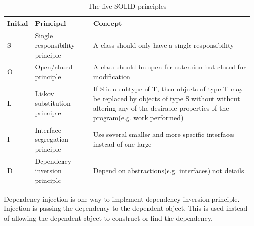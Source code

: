 \documentclass[10pt,a4paper]{report}
\begin{document}
\begin{table}[h]
\begin{tabular}{ l l p{2in}}
  \hline
  Initial & Principal & Concept\\
  \hline
  S & Single responsibility principle & A class should only have a single responsibility \\
  O & Open/closed principle & A class should be open for extension but closed for modification \\
  L & Liskov substitution principle & If S is a subtype of T, then objects of type T may be replaced by objects of type S without without altering any of the desirable properties of the program(e.g. work performed)\\
  I & Interface segregation principle & Use several smaller and more specific interfaces instead of one large \\
  D & Dependency inversion principle & Depend on abstractions(e.g. interfaces) not details \\
  \hline  
\end{tabular}
\caption{The five SOLID principles}
\label{table:solid_table}
\end{table}

Dependency injection is one way to implement dependency inversion principle\cite{cleancode2008}. Injection is passing the dependency to the dependent object. This is used instead of allowing the dependent object to construct or find the dependency.
\end{document}
